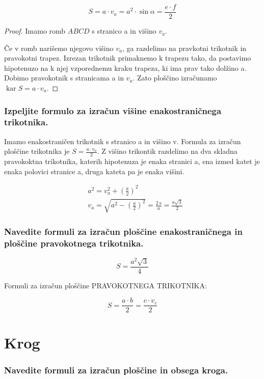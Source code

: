 \documentclass{article}
\begin{document}
$$
S=a \cdot v_{a}=a^{2} \cdot \sin \alpha=\frac{e \cdot f}{2}
$$

\begin{proof}
    Imamo romb $A B C D$ s stranico a in višino $v_{a}$.

    Če v romb narišemo njegovo višino $v_{a}$, ga razdelimo na pravkotni trikotnik in pravokotni trapez. Izrezan trikotnik primaknemo $\mathrm{k}$ trapezu tako, da postavimo hipotenuzo na k njej vzporednemu kraku trapeza, ki ima prav tako dolžino a. Dobimo pravokotnik s stranicama a in $v_{a}$. Zato ploščino izračunamo $\operatorname{kar} S=a \cdot v_{a}$.
\end{proof}

\subsubsection*{Izpeljite formulo za izračun višine enakostraničnega trikotnika.}

Imamo enakostraničen trikotnik s stranico a in višino v. Formula za izračun ploščine trikotnika je $S=\frac{a \cdot v_{a}}{2}$. Z višino trikontik razdelimo na dva skladna pravokoktna trikotnika, katerih hipotenuza je enaka stranici a, ena izmed katet je enaka polovici stranice a, druga kateta pa je enaka višini.

$$
\begin{aligned}
& a^{2}=v_{a}^{2}+\left(\frac{a}{2}\right)^{2} \\
& v_{a}=\sqrt{a^{2}-\left(\frac{a}{2}\right)^{2}}=\frac{2 \mathrm{~s}}{a}=\frac{a \sqrt{3}}{2}
\end{aligned}
$$

\subsubsection*{Navedite formuli za izračun ploščine enakostraničnega in ploščine pravokotnega trikotnika.}

$$
S=\frac{a^{2} \sqrt{3}}{4}
$$

Formuli za izračun ploščine PRAVOKOTNEGA TRIKOTNIKA:

$$
S=\frac{a \cdot b}{2}=\frac{c \cdot v_{c}}{2}
$$

\section{Krog}

\subsubsection*{Navedite formuli za izračun ploščine in obsega kroga.}
\end{document}
